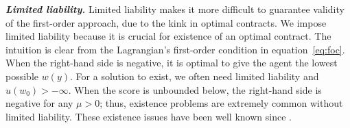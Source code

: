 \medskip\noindent\textit{\textbf{Limited liability.}}
Limited liability makes it more difficult to guarantee validity of the first-order approach, due to the kink in optimal contracts. We impose limited liability because it is crucial for existence of an optimal contract. The intuition is clear from the Lagrangian's first-order condition in equation~\eqref{eq:foc}. When the right-hand side is negative, it is optimal to give the agent the lowest possible $w(y)$. For a solution to exist, we often need limited liability and $u(w_0) > - \infty$. When the score is unbounded below, the right-hand side is negative for any $\mu >0$; thus, existence problems are extremely common without limited liability. These existence issues have been well known since \textcite{mirrlees1999}.

